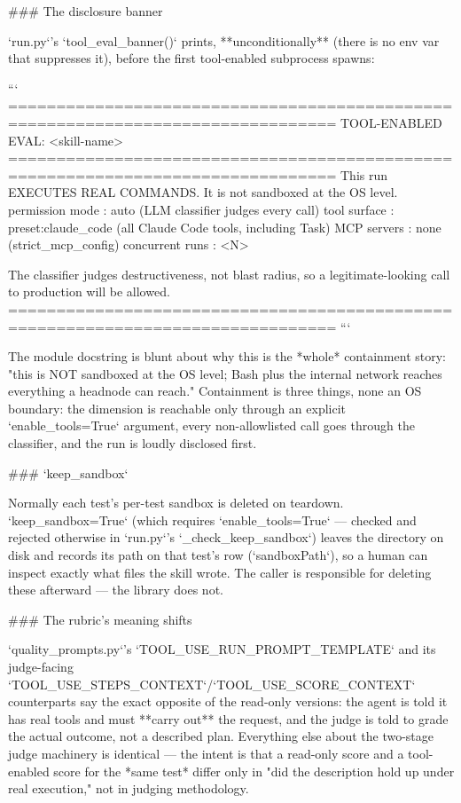 ### The disclosure banner

`run.py`'s `tool_eval_banner()` prints, **unconditionally** (there is no env var that suppresses it), before the first tool-enabled subprocess spawns:

```
================================================================================
TOOL-ENABLED EVAL: <skill-name>
================================================================================
This run EXECUTES REAL COMMANDS. It is not sandboxed at the OS level.
  permission mode : auto (LLM classifier judges every call)
  tool surface    : preset:claude_code (all Claude Code tools, including Task)
  MCP servers     : none (strict_mcp_config)
  concurrent runs : <N>

The classifier judges destructiveness, not blast radius,
so a legitimate-looking call to production will be allowed.
================================================================================
```

The module docstring is blunt about why this is the *whole* containment story: "this is NOT sandboxed at the OS level; Bash plus the internal network reaches everything a headnode can reach." Containment is three things, none an OS boundary: the dimension is reachable only through an explicit `enable_tools=True` argument, every non-allowlisted call goes through the classifier, and the run is loudly disclosed first.

### `keep_sandbox`

Normally each test's per-test sandbox is deleted on teardown. `keep_sandbox=True` (which requires `enable_tools=True` — checked and rejected otherwise in `run.py`'s `_check_keep_sandbox`) leaves the directory on disk and records its path on that test's row (`sandboxPath`), so a human can inspect exactly what files the skill wrote. The caller is responsible for deleting these afterward — the library does not.

### The rubric's meaning shifts

`quality_prompts.py`'s `TOOL_USE_RUN_PROMPT_TEMPLATE` and its judge-facing `TOOL_USE_STEPS_CONTEXT`/`TOOL_USE_SCORE_CONTEXT` counterparts say the exact opposite of the read-only versions: the agent is told it has real tools and must **carry out** the request, and the judge is told to grade the actual outcome, not a described plan. Everything else about the two-stage judge machinery is identical — the intent is that a read-only score and a tool-enabled score for the *same test* differ only in "did the description hold up under real execution," not in judging methodology.

